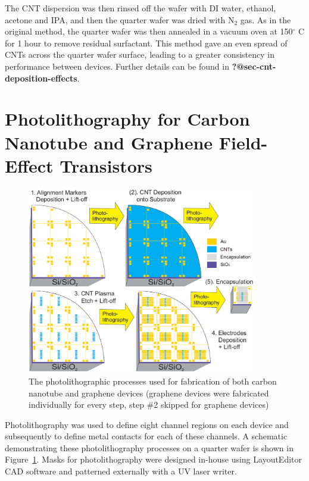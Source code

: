 \documentclass[
  a4paper,
]{scrbook}
\begin{document}
The CNT dispersion was then rinsed off the wafer with DI water, ethanol,
acetone and IPA, and then the quarter wafer was dried with N\(_2\) gas.
As in the original method, the quarter wafer was then annealed in a
vacuum oven at 150\(^\circ\) C for 1 hour to remove residual surfactant.
This method gave an even spread of CNTs across the quarter wafer
surface, leading to a greater consistency in performance between
devices. Further details can be found in
\textbf{?@sec-cnt-deposition-effects}.

\hypertarget{photolithography-for-carbon-nanotube-and-graphene-field-effect-transistors}{%
\section{Photolithography for Carbon Nanotube and Graphene Field-Effect
Transistors}\label{photolithography-for-carbon-nanotube-and-graphene-field-effect-transistors}}

\begin{figure}

{\centering \includegraphics[width=0.9\textwidth,height=\textheight]{./figures/ch4/photolithography-cycle.png}

}

\caption{\label{fig-qw-photolithography}The photolithographic processes
used for fabrication of both carbon nanotube and graphene devices
(graphene devices were fabricated individually for every step, step \#2
skipped for graphene devices)}

\end{figure}

Photolithography was used to define eight channel regions on each device
and subsequently to define metal contacts for each of these channels. A
schematic demonstrating these photolithography processes on a quarter
wafer is shown in Figure~\ref{fig-qw-photolithography}. Masks for
photolithography were designed in-house using LayoutEditor CAD software
and patterned externally with a UV laser writer.
\end{document}
